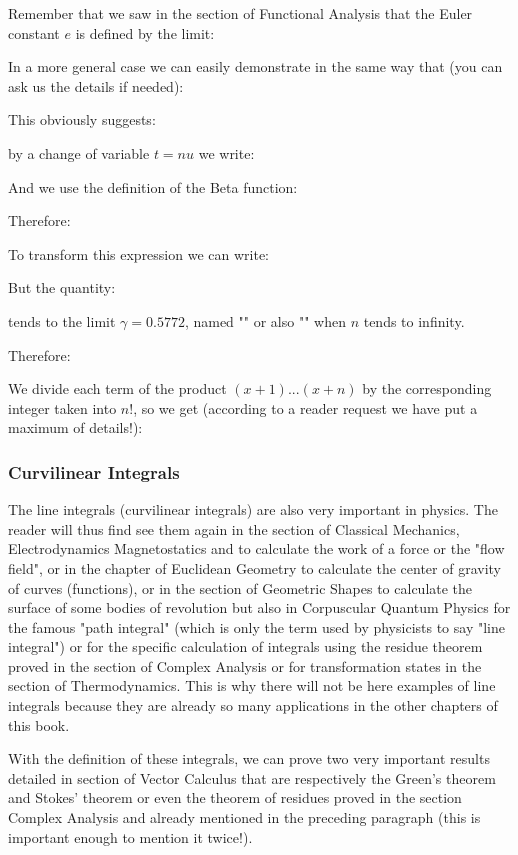 	Remember that we saw in the section of Functional Analysis that the Euler constant $e$ is defined by the limit:
	
	
	In a more general case we can easily demonstrate in the same way that (you can ask us the details if needed):	
	
	This obviously suggests:
	
	by a change of variable $t=nu$ we write:
	
	And we use the definition of the Beta function:
	
	Therefore:
	
	To transform this expression we can write:
	
	But the quantity:
	
	tends to the limit $\gamma=0.5772$, named "" or also "" when $n$ tends to infinity.
	
	Therefore:
	
	We divide each term of the product $(x+1)...(x+n)$ by the corresponding integer taken into $n!$, so we get (according to a reader request we have put a maximum of details!):
    
	
	\pagebreak
	\subsubsection{Curvilinear Integrals}\label{curvilinear integral}
	The line integrals (curvilinear integrals) are also very important in physics. The reader will thus find see them again in the section of Classical Mechanics, Electrodynamics Magnetostatics and to calculate the work of a force or the "flow field", or in the chapter of Euclidean Geometry to calculate the center of gravity of curves (functions), or in the section of Geometric Shapes to calculate the surface of some bodies of revolution but also in Corpuscular Quantum Physics for the famous "path integral" (which is only the term used by physicists to say "line integral") or for the specific calculation of integrals using the residue theorem proved in the section of Complex Analysis or for transformation states in the section of Thermodynamics. This is why there will not be here examples of line integrals because they are already so many applications in the other chapters of this book.
	
	With the definition of these integrals, we can prove two very important results detailed in section of Vector Calculus that are respectively the Green's theorem and Stokes' theorem or even the theorem of residues proved in the section Complex Analysis and already mentioned in the preceding paragraph (this is important enough to mention it twice!).
	
